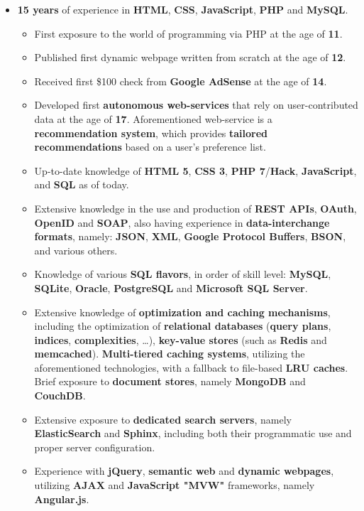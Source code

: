 \documentclass[11pt,a4paper,sans]{moderncv}
\begin{document}
	\begin{itemize}
	\item	\label{webdev}  \textbf{15 years} of experience in \textbf{HTML}, \textbf{CSS}, \textbf{JavaScript}, \textbf{PHP} and \textbf{MySQL}.
		\begin{itemize}
		\item	First exposure to the world of programming via PHP at the age of \textbf{11}.
		\item	Published first dynamic webpage written from scratch at the age of \textbf{12}.
		\item	Received first \$100 check from \textbf{Google AdSense} at the age of \textbf{14}.
		\item	Developed first \textbf{autonomous web-services} that rely on user-contributed data at the age of \textbf{17}. Aforementioned web-service is a \textbf{recommendation system}, which provides \textbf{tailored recommendations} based on a user's preference list.
		\item	Up-to-date knowledge of \textbf{HTML 5}, \textbf{CSS 3}, \textbf{PHP 7}/\textbf{Hack}, \textbf{JavaScript}, and \textbf{SQL} as of today.
		\item	Extensive knowledge in the use and production of \textbf{REST APIs}, \textbf{OAuth}, \textbf{OpenID} and \textbf{SOAP}, also having experience in \textbf{data-interchange formats}, namely: \textbf{JSON}, \textbf{XML}, \textbf{Google Protocol Buffers}, \textbf{BSON}, and various others.
		\item	Knowledge of various \textbf{SQL flavors}, in order of skill level: \textbf{MySQL}, \textbf{SQLite}, \textbf{Oracle}, \textbf{PostgreSQL} and \textbf{Microsoft SQL Server}.
		\item	Extensive knowledge of \textbf{optimization and caching mechanisms}, including the optimization of \textbf{relational databases} (\textbf{query plans}, \textbf{indices}, \textbf{complexities}, \ldots), \textbf{key-value stores} (such as \textbf{Redis} and \textbf{memcached}). \textbf{Multi-tiered caching systems}, utilizing the aforementioned technologies, with a fallback to file-based \textbf{LRU caches}. Brief exposure to \textbf{document stores}, namely \textbf{MongoDB} and \textbf{CouchDB}.
		\item	Extensive exposure to \textbf{dedicated search servers}, namely \textbf{ElasticSearch} and \textbf{Sphinx}, including both their programmatic use and proper server configuration. 
		\item	Experience with \textbf{jQuery}, \textbf{semantic web} and \textbf{dynamic webpages}, utilizing \textbf{AJAX} and \textbf{JavaScript "MVW"} frameworks, namely \textbf{Angular.js}.

\end{itemize}
\end{itemize}
\end{document}
